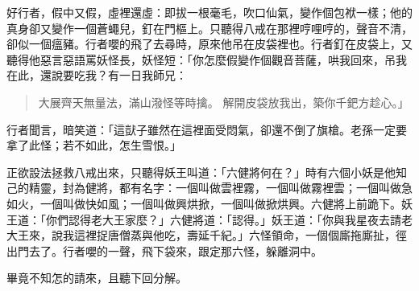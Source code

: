 好行者，假中又假，虛裡還虛：即拔一根毫毛，吹口仙氣，變作個包袱一樣；他的真身卻又變作一個蒼蠅兒，釘在門樞上。只聽得八戒在那裡哼哩哼的，聲音不清，卻似一個瘟豬。行者嚶的飛了去尋時，原來他吊在皮袋裡也。行者釘在皮袋上，又聽得他惡言惡語罵妖怪長，妖怪短：「你怎麼假變作個觀音菩薩，哄我回來，吊我在此，還說要吃我？有一日我師兄：
\begin{quote}
大展齊天無量法，滿山潑怪等時擒。
解開皮袋放我出，築你千鈀方趁心。」
\end{quote}

行者聞言，暗笑道：「這獃子雖然在這裡面受悶氣，卻還不倒了旗槍。老孫一定要拿了此怪；若不如此，怎生雪恨。」

正欲設法拯救八戒出來，只聽得妖王叫道：「六健將何在？」時有六個小妖是他知己的精靈，封為健將，都有名字：一個叫做雲裡霧，一個叫做霧裡雲；一個叫做急如火，一個叫做快如風；一個叫做興烘掀，一個叫做掀烘興。六健將上前跪下。妖王道：「你們認得老大王家麼？」六健將道：「認得。」妖王道：「你與我星夜去請老大王來，說我這裡捉唐僧蒸與他吃，壽延千紀。」六怪領命，一個個廝拖廝扯，徑出門去了。行者嚶的一聲，飛下袋來，跟定那六怪，躲離洞中。

畢竟不知怎的請來，且聽下回分解。
